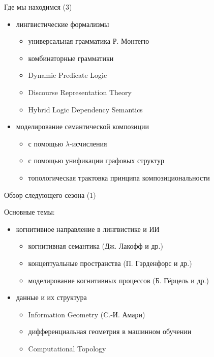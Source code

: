 \documentclass{beamer}
\begin{document}
\begin{frame}{Где мы находимся (3)}
\begin{small}
\begin{itemize}
    \item лингвистические формализмы
    \begin{itemize}
        \item универсальная грамматика Р. Монтегю
        \item комбинаторные грамматики
        \item Dynamic Predicate Logic 
        \item Discourse Representation Theory
        \item Hybrid Logic Dependency Semantics
    \end{itemize}
    \item моделирование семантической композиции
    \begin{itemize}
        \item с помощью $\lambda$-исчисления
        \item с помощью унификации графовых структур
        \item топологическая трактовка принципа композициональности
    \end{itemize}
\end{itemize}
\end{small}
\end{frame}


\begin{frame}{Обзор следующего сезона (1)}
\begin{small}
Основные темы:\\
\medskip
\begin{itemize}
    \item когнитивное направление в лингвистике и ИИ
    \begin{itemize}
        \item когнитивная семантика (Дж. Лакофф и др.)
        \item концептуальные пространства (П. Гэрденфорс и др.)
        \item моделирование когнитивных процессов (Б. Гёрцель и др.)
    \end{itemize}
	\item данные и их структура
	\begin{itemize}
    	\item Information Geometry (C.-И. Амари)
    	\item дифференциальная геометрия в машинном обучении
    	\item Computational Topology
	\end{itemize}
\end{itemize}
\end{small}
\end{frame}
\end{document}

